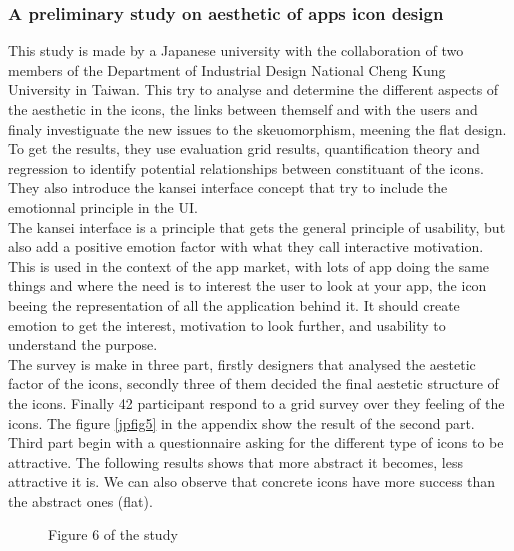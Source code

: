 \documentclass[a4paper,11pt] {article}
\theoremstyle{definition}
\begin{document}
    \subsubsection{A preliminary study on aesthetic of apps icon design\cite{jpAnalitics}}
This study is made by a Japanese university with the collaboration of two members of the Department of Industrial Design National Cheng Kung University in Taiwan. This try to analyse and determine the different aspects of the aesthetic in the icons, the links between themself and with the users and finaly investiguate the new issues to the skeuomorphism, meening the flat design. To get the results, they use evaluation grid results, quantification theory and regression to identify potential relationships between constituant of the icons. They also introduce the kansei interface concept that try to include the emotionnal principle in the UI.
\\
The kansei interface is a principle that gets the general principle of usability, but also add a positive emotion factor with what they call interactive motivation. This is used in the context of the app market, with lots of app doing the same things and where the need is to interest the user to look at your app, the icon beeing the representation of all the application behind it. It should create emotion to get the interest, motivation to look further, and usability to understand the purpose.
\\
The survey is make in three part, firstly designers that analysed the aestetic factor of the icons, secondly three of them decided the final aestetic structure of the icons. Finally 42 participant respond to a grid survey over they feeling of the icons. The figure \ref{jpfig5} in the appendix show the result of the second part.
\\
Third part begin with a questionnaire asking for the different type of icons to be attractive. The following results shows that more abstract it becomes, less attractive it is. We can also observe that concrete icons have more success than the abstract ones (flat).
\begin{figure}[H]
  \caption{Figure 6 of the study}\label{jpfig6}
\end{figure}
\end{document}
